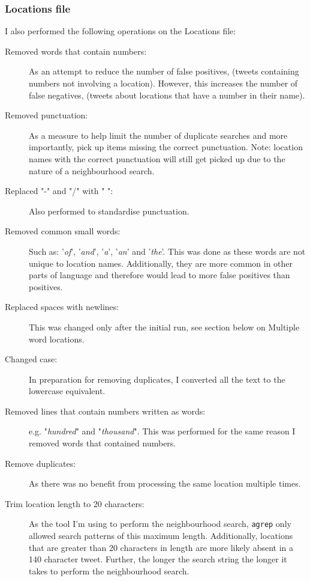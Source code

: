\documentclass[a4paper]{article}
\begin{document}
\subsubsection{Locations file}
I also performed the following operations on the Locations file:
\begin{description}
  \item[Removed words that contain numbers:] As an attempt to reduce the number of false positives, (tweets containing numbers not involving a location). However, this increases the number of false negatives, (tweets about locations that have a number in their name).
  \item[Removed punctuation:] As a measure to help limit the number of duplicate searches and more importantly, pick up items missing the correct punctuation. Note: location names with the correct punctuation will still get picked up due to the nature of a neighbourhood search.
  \item[Replaced "-" and "/" with " ":] Also performed to standardise punctuation.
  \item[Removed common small words:] Such as: '\textit{of}', '\textit{and}', '\textit{a}', '\textit{an}' and '\textit{the}'. This was done as these words are not unique to location names. Additionally, they are more common in other parts of language and therefore would lead to more false positives than positives.
  \item[Replaced spaces with newlines:] This was changed only after the initial run, see section below on Multiple word locations.
  \item[Changed case:] In preparation for removing duplicates, I converted all the text to the lowercase equivalent.
  \item[Removed lines that contain numbers written as words:] e.g. "\textit{hundred}" and "\textit{thousand}". This was performed for the same reason I removed words that contained numbers.
  \item[Remove duplicates:] As there was no benefit from processing the same location multiple times.
  \item[Trim location length to 20 characters:] As the tool I'm using to perform the neighbourhood search, \texttt{agrep} only allowed search patterns of this maximum length. Additionally, locations that are greater than 20 characters in length are more likely absent in a 140 character tweet. Further, the longer the search string the longer it takes to perform the neighbourhood search.
\end{description}
\end{document}
